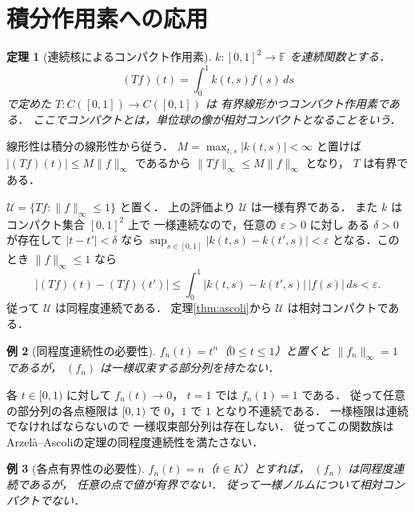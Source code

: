 \documentclass[a5paper,10pt,onecolumn]{jsarticle}
\makeatletter
\theoremstyle{mathnotetheorem}
\newtheorem{theorem}{定理}[section]
\newtheorem{example}[theorem]{例}
\renewcommand{\proofname}{証明}
\renewenvironment{proof}[1][\proofname]{%
  \par\pushQED{\qed}\normalfont\topsep4\p@\@plus2\p@\relax
  \trivlist\item[\hskip\labelsep\bfseries #1]\ignorespaces
}{\popQED\endtrivlist\@endpefalse}
\newcommand{\norm}[1]{\lVert #1\rVert}
\makeatother
\begin{document}
\section{積分作用素への応用}

\begin{theorem}[連続核によるコンパクト作用素]\label{thm:integral}
$k:[0,1]^2\to\mathbb F$ を連続関数とする．
\[
 (Tf)(t)=\int_0^1k(t,s)f(s)\,ds
\]
で定めた $T:C([0,1])\to C([0,1])$ は
有界線形かつコンパクト作用素である．
ここでコンパクトとは，単位球の像が相対コンパクトとなることをいう．
\end{theorem}
\begin{proof}
線形性は積分の線形性から従う．
$M=\max_{t,s}|k(t,s)|<\infty$ と置けば
$|(Tf)(t)|\le M\norm f_\infty$ であるから
$\norm{Tf}_\infty\le M\norm f_\infty$ となり，
$T$ は有界である．

$\mathcal U=\{Tf:\norm f_\infty\le1\}$ と置く．
上の評価より $\mathcal U$ は一様有界である．
また $k$ はコンパクト集合 $[0,1]^2$ 上で
一様連続なので，任意の $\varepsilon>0$ に対し
ある $\delta>0$ が存在して
$|t-t'|<\delta$ なら
$\sup_{s\in[0,1]}|k(t,s)-k(t',s)|<\varepsilon$
となる．このとき $\norm f_\infty\le1$ なら
\[
 |(Tf)(t)-(Tf)(t')|
 \le\int_0^1|k(t,s)-k(t',s)|\,|f(s)|\,ds
 <\varepsilon.
\]
従って $\mathcal U$ は同程度連続である．
定理\ref{thm:ascoli}から $\mathcal U$ は相対コンパクトである．
\end{proof}

\begin{example}[同程度連続性の必要性]
$f_n(t)=t^n$（$0\le t\le1$）と置くと
$\norm{f_n}_\infty=1$ であるが，
$(f_n)$ は一様収束する部分列を持たない．
\end{example}
\begin{proof}
各 $t\in[0,1)$ に対して $f_n(t)\to0$，
$t=1$ では $f_n(1)=1$ である．
従って任意の部分列の各点極限は
$[0,1)$ で $0$，$1$ で $1$ となり不連続である．
一様極限は連続でなければならないので
一様収束部分列は存在しない．
従ってこの関数族はArzel\`a--Ascoliの定理の同程度連続性を満たさない．
\end{proof}

\begin{example}[各点有界性の必要性]
$f_n(t)=n$（$t\in K$）とすれば，
$(f_n)$ は同程度連続であるが，
任意の点で値が有界でない．
従って一様ノルムについて相対コンパクトでない．
\end{example}
\end{document}
